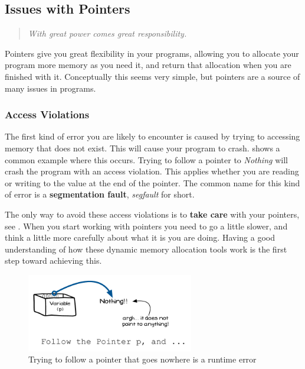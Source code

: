 \clearpage
\subsection{Issues with Pointers} %
\label{sub:issues_with_pointers}

\begin{quote}
\emph{With great power comes great responsibility.}
\end{quote}

Pointers give you great flexibility in your programs, allowing you to allocate your program more memory as you need it, and return that allocation when you are finished with it. Conceptually this seems very simple, but pointers are a source of many issues in programs.

\subsubsection{Access Violations} %
\label{ssub:access_violations}

The first kind of error you are likely to encounter is caused by trying to accessing memory that does not exist. This will cause your program to crash.  shows a common example where this occurs. Trying to follow a pointer to \emph{Nothing} will crash the program with an access violation. This applies whether you are reading or writing to the value at the end of the pointer. The common name for this kind of error is a \textbf{segmentation fault}, \emph{segfault} for short.

The only way to avoid these access violations is to \textbf{take care} with your pointers, see . When you start working with pointers you need to go a little slower, and think a little more carefully about what it is you are doing. Having a good understanding of how these dynamic memory allocation tools work is the first step toward achieving this.

\begin{figure}[h]
   \centering
   \includegraphics[width=0.65\textwidth]{./topics/dynamic-memory/diagrams/AccessViolation} 
   \caption{Trying to follow a pointer that goes nowhere is a runtime error}
   \label{fig:segfault}
\end{figure}

